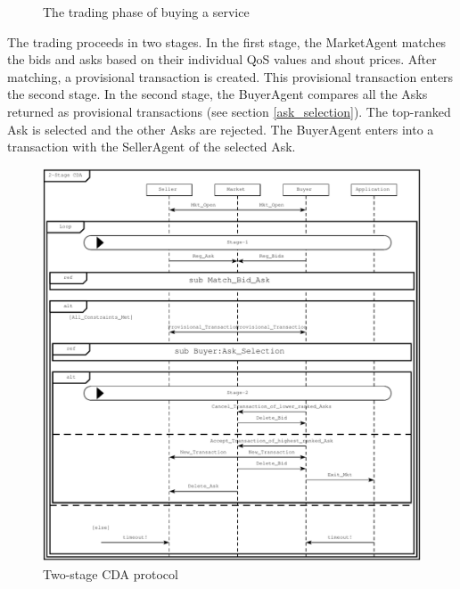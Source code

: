 \documentclass[10pt,journal,compsoc]{IEEEtran}
\begin{document}
\begin{figure}[h]
\caption{The trading phase of buying a service \label{fig:trading_phase}}
\end{figure}


The trading proceeds in two stages. In the first stage, the MarketAgent matches the bids and asks based on their individual QoS values and shout prices. After matching, a provisional transaction is created. This provisional transaction enters the second stage. In the second stage, the BuyerAgent compares all the Asks returned as provisional transactions (see section \ref{ask_selection}). The top-ranked Ask is selected and the other Asks are rejected. The BuyerAgent enters into a transaction with the SellerAgent of the selected Ask.
\begin{figure}[h]
\centering
\includegraphics[scale=0.7]{drawings/cda_protocol.pdf}
\caption{Two-stage CDA protocol \label{fig:cda_protocol}}
\end{figure}

\end{document}
